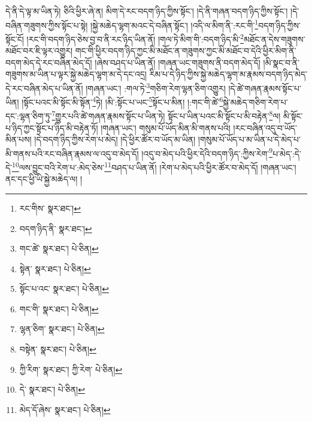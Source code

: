 དེ་ནི་དེ་ལྟ་མ་ཡིན་ཏེ། ཅིའི་ཕྱིར་ཞེ་ན། མིག་དེ་རང་བདག་ཉིད་ཀྱིས་སྟོང་། །དེ་ནི་གཞན་བདག་ཉིད་ཀྱིས་སྟོང་། །དེ་བཞིན་གཟུགས་ཀྱིས་སྟོང་པ་སྟེ། །སྐྱེ་མཆེད་ལྷག་མའང་དེ་བཞིན་སྟོང་། །འདི་ལ་མིག་ནི་:རང་གི་\footnote{རང་གིས་  སྣར་ཐང་། }བདག་ཉིད་ཀྱིས་སྟོང་ངོ། །རང་གི་བདག་ཉིད་ཅེས་བྱ་བ་ནི་རང་ཉིད་ཡིན་ནོ། །གལ་ཏེ་མིག་གི་:བདག་ཉིད་མི་\footnote{བདག་ཉིད་ནི་  སྣར་ཐང་། }མཐོང་ན་དེས་གཟུགས་མཐོང་བར་ཇི་ལྟར་འགྱུར། གང་གི་ཕྱིར་བདག་ཉིད་ཀྱང་མི་མཐོང་ན་གཟུགས་ཀྱང་མི་མཐོང་བ་དེའི་ཕྱིར་མིག་ནི་བདག་མེད་དེ་རང་བཞིན་མེད་དོ། །ཞེས་བཤད་པ་ཡིན་ནོ། །གཞན་ཡང་གཟུགས་ནི་བདག་མེད་དོ། །མི་སྣང་བ་ནི་གཟུགས་མ་ཡིན་པ་ལྟར་སྐྱེ་མཆེད་ལྷག་མ་དེ་དང་འདྲ། རིམ་པ་དེ་ཉིད་ཀྱིས་སྐྱེ་མཆེད་ལྷག་མ་རྣམས་བདག་ཉིད་མེད་དེ་རང་བཞིན་མེད་པ་ཡིན་ནོ། །གཞན་ཡང་། :གལ་ཏེ་\footnote{གང་ཚེ་  སྣར་ཐང་།  པེ་ཅིན། }གཅིག་རེག་ལྷན་ཅིག་འགྱུར། །དེ་ཚེ་གཞན་རྣམས་སྟོང་པ་ཡིན། །སྟོང་པའང་མི་སྟོང་མི་སྟོན་\footnote{སྟེན་  སྣར་ཐང་།  པེ་ཅིན། }ཏེ། །མི་:སྟོང་པ་ཡང་\footnote{སྟོང་པ་འང་  སྣར་ཐང་།  པེ་ཅིན། }སྟོང་པ་མིན། །:གང་གི་ཚེ་\footnote{གང་གི་  སྣར་ཐང་།  པེ་ཅིན། }སྐྱེ་མཆེད་གཅིག་རེག་པ་དང་:ལྷན་ཅིག་ཏུ་\footnote{ལྷན་ཅིག་  སྣར་ཐང་།  པེ་ཅིན། }གྱུར་པའི་ཚེ་གཞན་རྣམས་སྟོང་པ་ཡིན་ཏེ། སྟོང་པ་ཡིན་པའང་མི་སྟོང་པ་མི་བརྟེན་\footnote{བསྟེན་  སྣར་ཐང་།  པེ་ཅིན། }ལ། མི་སྟོང་པ་ཉིད་ཀྱང་སྟོང་པ་ཉིད་མི་བརྟེན་ཏོ། །གཞན་ཡང་། གསུམ་པོ་ཡོད་མིན་མི་གནས་པའི། །རང་བཞིན་འདུ་བ་ཡོད་མིན་པས། །དེ་བདག་ཉིད་ཀྱིས་རེག་པ་མེད། །དེ་ཕྱིར་ཚོར་བ་ཡོད་མ་ཡིན། །གསུམ་པོ་ཡོད་པ་མ་ཡིན་པ་དེ་མེད་པ་མི་གནས་པའི་རང་བཞིན་རྣམས་ལ་འདུ་བ་མེད་དོ། །འདུ་བ་མེད་པའི་ཕྱིར་དེའི་བདག་ཉིད་:ཀྱིས་རེག་\footnote{ཀྱི་རིག་  སྣར་ཐང་། ཀྱི་རེག་  པེ་ཅིན། }པ་མེད་:དེ་དེ་\footnote{དེ་  སྣར་ཐང་།  པེ་ཅིན། }ལས་བྱུང་བའི་རེག་པ་:མེད་ཅེས་\footnote{མེད་དོ་ཞེས་  སྣར་ཐང་།  པེ་ཅིན། }བཤད་པ་ཡིན་ནོ། །རེག་པ་མེད་པའི་ཕྱིར་ཚོར་བ་མེད་དོ། །གཞན་ཡང་། ནང་དང་ཕྱི་ཡི་སྐྱེ་མཆེད་ལ། །
